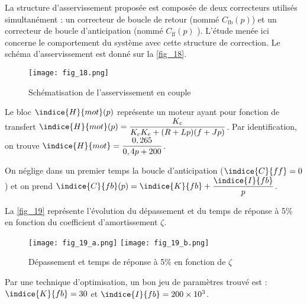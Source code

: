 La structure d’asservissement proposée est composée de deux correcteurs utilisés simultanément :
un correcteur de boucle de retour (nommé $C_{\text{fb}}( p)$) et un correcteur de boucle d'anticipation
(nommé $C_{\text{ff}}( p)$ ). L’étude menée ici concerne le comportement du système avec cette structure
de correction.
Le schéma d'asservissement est donné sur la \autoref{fig_18}.

\begin{figure}[H]
\centering
\texttt{[image: fig\_18.png]}
\caption{Schématisation de l'asservissement en couple \label{fig_18}}
\end{figure}


Le bloc  $\indice{H}{mot} (p)$ représente un moteur ayant pour fonction de transfert
$\indice{H}{mot} (p)=\dfrac{K_c}{K_c K_e+(R+Lp)( f +Jp)}$. Par identification, on trouve $\indice{H}{mot}= \dfrac{0,265}{0,4 p+200}$.



On néglige dans un premier temps la boucle d'anticipation ($\indice{C}{ff} =0$) et on prend
$\indice{C}{fb}( p)=\indice{K}{fb}+\dfrac{\indice{I}{fb}}{p}$.


La \autoref{fig_19} représente l'évolution du dépassement et du temps de réponse à 5\% en fonction du
coefficient d'amortissement $\zeta$.


\begin{figure}[H]
\centering
\texttt{[image: fig\_19\_a.png]}
\texttt{[image: fig\_19\_b.png]}
\caption{Dépassement et temps de réponse à 5\% en fonction de $\zeta$ \label{fig_19}}
\end{figure}




Par une technique d’optimisation, un bon jeu de paramètres trouvé est : $\indice{K}{fb}=30$ et $\indice{I}{fb}=200\times10^{3}$.




